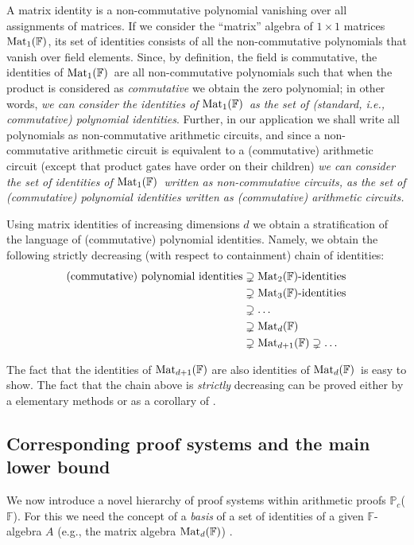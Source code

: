 \documentclass[12pt,reqno]{article}
\newcommand\F{\ensuremath{\mathbb F}}
\newcommand\PP{{\mathbb P}}
\newcommand\PC{\ensuremath{\PP_c}}
\newcommand{\matd}{{\ensuremath{{\rm Mat}_d(\F)}}}
\newcommand{\mattwo}{{\ensuremath{{\rm Mat}_2(\F)}}}
\newcommand{\matone}{{\ensuremath{{\rm Mat}_1(\F)}}}
\newcommand{\matthree}{{\ensuremath{{\rm Mat}_3(\F)}}}
\begin{document}
A matrix identity is a non-commutative polynomial vanishing over all assignments of matrices. If we consider the ``matrix'' algebra of $1 \times 1$ matrices \matone, its set of identities consists of all the non-commutative polynomials that vanish over field elements. Since, by definition, the field is commutative, the identities of \matone\ are all non-commutative polynomials such that when the product is considered as \emph{commutative} we obtain the zero polynomial; in other words, \textit{we can consider the identities of \matone\ as the set of (standard, i.e., commutative) polynomial identities}. Further, in our application we shall write all polynomials as non-commutative arithmetic circuits, and since a non-commutative arithmetic circuit is equivalent to a (commutative) arithmetic circuit (except that product gates have order on their children) \textit{we can consider the set of identities of \matone\ written as non-commutative circuits, as the set of (commutative) polynomial identities written as (commutative) arithmetic circuits.}

Using matrix identities of increasing dimensions $d$ we obtain a stratification of the language of (commutative) polynomial identities. Namely, we obtain the following strictly decreasing (with respect to containment) chain of identities:
\begin{align}\notag
\hbox{(commutative) polynomial identities} & \supsetneq \mattwo\hbox{-identities} \\ \notag
        &\supsetneq \hbox{\matthree-identities} \\ \label{eq:chain}
        &\supsetneq \ldots \\ \notag
        &\supsetneq \matd \\ \notag
        &\supsetneq {\rm Mat}_{d+1}(\F) \supsetneq\ldots\notag
\end{align}

The fact that the identities of  ${\rm Mat}_{d+1}(\F)$ are also identities of \matd\ is easy to show. The fact that the chain above is  \textit{strictly} decreasing  can be proved  either by a elementary methods \cite{Jer14-personal_communication} or as a corollary of \cite{AL50}.

\subsection{Corresponding proof systems and the main lower bound }\label{sec:ovrv:proof_system_for_matrix_identities}

We now introduce a novel  hierarchy of proof systems within arithmetic proofs \PC(\F).
For this we need the concept of a \textit{basis} of a set of identities of a given \F-algebra $A$ (e.g., the matrix algebra \matd) .
\end{document}
